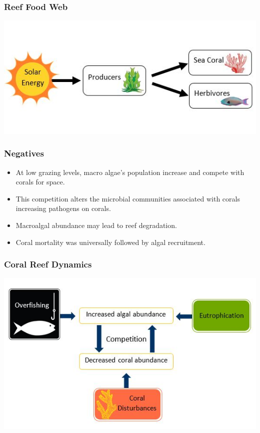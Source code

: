 \begin{frame}
\frametitle{Reef Food Web}
\includegraphics[scale=.8]{./CoralFoodWeb}
\end{frame}

\begin{frame}
\frametitle{Negatives}
\begin{itemize}
\item At low grazing levels, macro algae’s population increase and compete with corals for space.
\item This competition alters the microbial communities associated with corals increasing pathogens on corals.
\item Macroalgal abundance may lead to reef degradation.
\item Coral mortality was universally followed by algal recruitment.
\end{itemize}
\end{frame}

\begin{frame}
\frametitle{Coral Reef Dynamics}
\includegraphics[scale=.7]{./CoralDynamics}
\end{frame}


